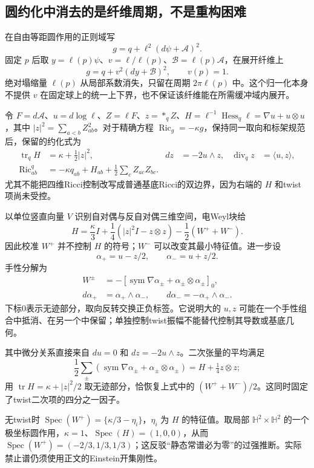 \documentclass[UTF8,a4paper,11pt,fontset=fandol]{ctexart}
\numberwithin{equation}{section}
\theoremstyle{definition}
\newcommand{\Ric}{\operatorname{Ric}}
\newcommand{\tr}{\operatorname{tr}}
\begin{document}
\subsection{圆约化中消去的是纤维周期，不是重构困难}
在自由等距圆作用的正则域写
\[
g=q+\ell^2(d\psi+\mathcal A)^2.
\]
固定 $p$ 后取 $y=\ell(p)\psi$、$v=\ell/\ell(p)$、$\mathcal B=\ell(p)\mathcal A$，在展开纤维上
\[
g=q+v^2(dy+\mathcal B)^2,\qquad v(p)=1.
\]
绝对塌缩量 $\ell(p)$ 从局部系数消失，只留在周期 $2\pi\ell(p)$ 中。这个归一化本身不提供 $v$ 在固定球上的统一上下界，也不保证该纤维能在所需缓冲域内展开。

令 $F=d\mathcal A$、$u=d\log\ell$、$Z=\ell F$、$z=*_{q}Z$、$H=\ell^{-1}\operatorname{Hess}_q\ell=\nabla u+u\otimes u$，其中 $|z|^2=\sum_{a<b}Z_{ab}^2$。对于精确方程 $\Ric_g=-\kappa g$，保持同一取向和标架规范后，保留的约化式为
\begin{align*}
\tr_q H&=\kappa+\tfrac12|z|^2,
&dz&=-2u\wedge z,&\operatorname{div}_qz&=\langle u,z\rangle,\\
\Ric^q_{ab}&=-\kappa q_{ab}+H_{ab}
+\tfrac12\sum_cZ_{ac}Z_{bc}.
\end{align*}
尤其不能把四维Ricci控制改写成普通基底Ricci的双边界，因为右端的 $H$ 和twist项尚未受控。

以单位竖直向量 $V$ 识别自对偶与反自对偶三维空间，电Weyl块给
\[
H=\frac{\kappa}{3}I+\frac14(|z|^2I-z\otimes z)
-\frac12(W^++W^-).
\]
因此校准 $W^+$ 并不控制 $H$ 的符号；$W^-$ 可以改变其最小特征值。进一步设
\[
\alpha_+=u-z/2,\qquad \alpha_-=u+z/2.
\]
手性分解为
\begin{align*}
W^\pm&=-[\operatorname{sym}\nabla\alpha_\pm+
\alpha_\pm\otimes\alpha_\pm]_0,\\
d\alpha_+&=\alpha_+\wedge\alpha_-,\qquad
d\alpha_-=-\alpha_+\wedge\alpha_-.
\end{align*}
下标0表示无迹部分，取向反转交换正负标签。它说明大的 $u,z$ 可能在一个手性组合中抵消、在另一个中保留；单独控制twist振幅不能替代控制其导数或基底几何。

其中微分关系直接来自 $du=0$ 和 $dz=-2u\wedge z$。二次张量的平均满足
\[
\frac12\sum_{\pm}
(\operatorname{sym}\nabla\alpha_\pm+\alpha_\pm\otimes\alpha_\pm)
=H+\tfrac14z\otimes z;
\]
用 $\tr H=\kappa+|z|^2/2$ 取无迹部分，恰恢复上式中的 $(W^++W^-)/2$。这同时固定了twist二次项的四分之一因子。

无twist时 $\operatorname{Spec}(W^+)=\{\kappa/3-\eta_i\}$，$\eta_i$ 为 $H$ 的特征值。取局部 $\mathbb H^2\times\mathbb H^2$ 的一个极坐标圆作用，$\kappa=1$、$\operatorname{Spec}(H)=(1,0,0)$，从而 $\operatorname{Spec}(W^+)=(-2/3,1/3,1/3)$；这反驳“静态常谱必为零”的过强推断。实际禁止谱仍须使用正文的Einstein开集刚性。
\end{document}
